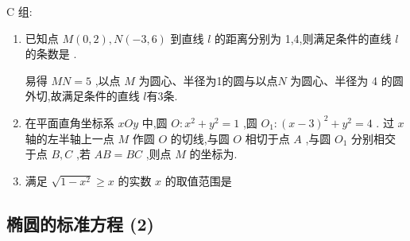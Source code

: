 C 组:
\begin{enumerate}

    \item 已知点 $M\left( {0,2}\right) ,N\left( {-3,6}\right)$ 到直线 $l$ 的距离分别为 1,4,则满足条件的直线 $l$ 的条数是 .
    \begin{jieda}
        易得 ${MN} = 5$ ,以点 $M$ 为圆心、半径为1的圆与以点$N$ 为圆心、半径为 4 的圆外切,故满足条件的直线 $l$有3条.
    \end{jieda}
    
    \item 在平面直角坐标系 ${xOy}$ 中,圆 $O : {x}^{2} + {y}^{2} = 1$ ,圆 ${O}_{1} : {\left( x - 3\right) }^{2} + {y}^{2} = 4$ . 过 $x$ 轴的左半轴上一点 $M$ 作圆 $O$ 的切线,与圆 $O$ 相切于点 $A$ ,与圆 ${O}_{1}$ 分别相交于点 $B,C$ ,若 ${AB} = {BC}$ ,则点 $M$ 的坐标为.

    \item 满足 $\sqrt{1 - {x}^{2}} \geq  x$ 的实数 $x$ 的取值范围是
    
\end{enumerate}

\clearpage
\subsection*{椭圆的标准方程 (2)}

